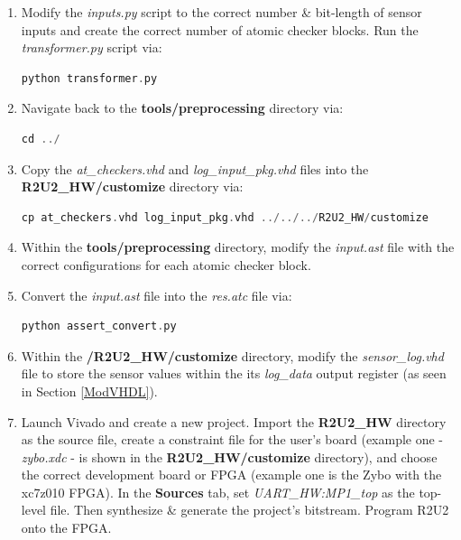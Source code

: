 \begin{enumerate}
	\item Modify the \textit{inputs.py} script to  the correct number \& bit-length of sensor inputs and create the correct number of atomic checker blocks. Run the \textit{transformer.py} script via: 
	\begin{lstlisting}[language=C]
	python transformer.py
	\end{lstlisting}
	
	\item Navigate back to the \textbf{tools/preprocessing} directory via: 
	\begin{lstlisting}[language=C]
	cd ../
	\end{lstlisting}
	
	\item Copy the \textit{at\_checkers.vhd} and \textit{log\_input\_pkg.vhd} files into the \textbf{R2U2\_HW/customize} directory via:
	\begin{lstlisting}[language=C]
	cp at_checkers.vhd log_input_pkg.vhd ../../../R2U2_HW/customize
	\end{lstlisting}
	\item Within the \textbf{tools/preprocessing} directory, modify the \textit{input.ast} file with the correct configurations for each atomic checker block. 

	\item Convert the \textit{input.ast} file into the \textit{res.atc} file via: 
	\begin{lstlisting}[language=C]
	python assert_convert.py
	\end{lstlisting}
	
	\item Within the \textbf{/R2U2\_HW/customize} directory, modify the \textit{sensor\_log.vhd} file to store the sensor values within the its \textit{log\_data} output register (as seen in Section \ref{ModVHDL}).
	
	\item Launch Vivado and create a new project. Import the \textbf{R2U2\_HW} directory  as the source file, create a constraint file for the user's board (example one - \textit{zybo.xdc} - is shown in the \textbf{R2U2\_HW/customize} directory), and choose the correct development board or FPGA (example one is the Zybo with the xc7z010 FPGA). In the \textbf{Sources} tab, set \textit{UART\_HW:MP1\_top} as the top-level file. Then synthesize \& generate the project's bitstream. Program R2U2 onto the FPGA.
	

\end{enumerate}
